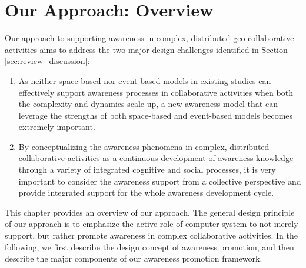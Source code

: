 \graphicspath{{Figures/}}

\chapter{Our Approach: Overview} %
\label{cha:our_approach_overview}

Our approach to supporting awareness in complex, distributed geo-collaborative activities aims to address the two major design challenges identified in Section \ref{sec:review_discussion}: 

\begin{enumerate}
   \item As neither space-based nor event-based models in existing studies can effectively support awareness processes in collaborative activities when both the complexity and dynamics scale up, a new awareness model that can leverage the strengths of both space-based and event-based models becomes extremely important.
   \item By conceptualizing the awareness phenomena in complex, distributed collaborative activities as a continuous development of awareness knowledge through a variety of integrated cognitive and social processes, it is very important to consider the awareness support from a collective perspective and provide integrated support for the whole awareness development cycle.
\end{enumerate}

This chapter provides an overview of our approach. The general design principle of our approach is to emphasize the active role of computer system to not merely support, but rather promote awareness in complex collaborative activities. In the following, we first describe the design concept of awareness promotion, and then describe the major components of our awareness promotion framework.


